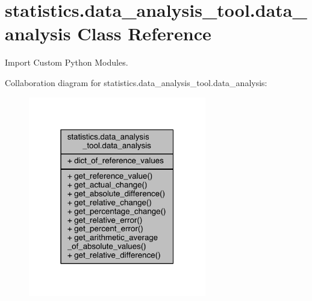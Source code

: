 \hypertarget{classstatistics_1_1data__analysis__tool_1_1data__analysis}{}\section{statistics.\+data\+\_\+analysis\+\_\+tool.\+data\+\_\+analysis Class Reference}
\label{classstatistics_1_1data__analysis__tool_1_1data__analysis}


Import Custom Python Modules.  




Collaboration diagram for statistics.\+data\+\_\+analysis\+\_\+tool.\+data\+\_\+analysis\+:
\nopagebreak
\begin{figure}[H]
\begin{center}
\leavevmode
\includegraphics[width=220pt]{db/da4/classstatistics_1_1data__analysis__tool_1_1data__analysis__coll__graph}
\end{center}
\end{figure}
